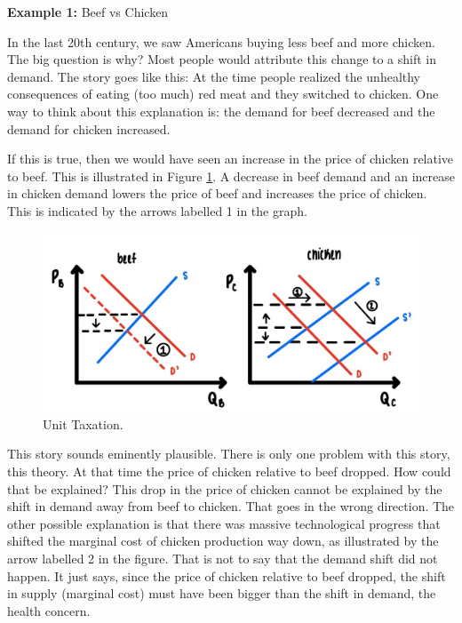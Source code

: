 \documentclass[
]{book}
\begin{document}
\textbf{Example 1:} Beef vs Chicken

In the last 20th century, we saw Americans buying less beef and more chicken. The big question is why? Most people would attribute this change to a shift in demand. The story goes like this: At the time people realized the unhealthy consequences of eating (too much) red meat and they switched to chicken. One way to think about this explanation is: the demand for beef decreased and the demand for chicken increased.

If this is true, then we would have seen an increase in the price of chicken relative to beef. This is illustrated in Figure \ref{fig:compmarkets05}. A decrease in beef demand and an increase in chicken demand lowers the price of beef and increases the price of chicken. This is indicated by the arrows labelled 1 in the graph.

\begin{figure}

{\centering \includegraphics[width=0.9\linewidth]{img/compmarkets/fig5} 

}

\caption{Unit Taxation.}\label{fig:compmarkets05}
\end{figure}

This story sounds eminently plausible. There is only one problem with this story, this theory. At that time the price of chicken relative to beef dropped.
How could that be explained? This drop in the price of chicken cannot be explained by the shift in demand away from beef to chicken. That goes in the wrong direction. The other possible explanation is that there was massive technological progress that shifted the marginal cost of chicken production way down, as illustrated by the arrow labelled 2 in the figure.
That is not to say that the demand shift did not happen. It just says, since the price of chicken relative to beef dropped, the shift in supply (marginal cost) must have been bigger than the shift in demand, the health concern.
\end{document}
